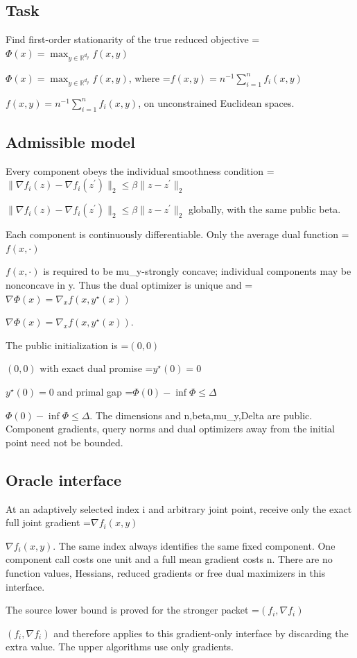 \documentclass[10pt,a4paper]{article}
\newcommand{\AtlasMath}[1]{\par\begingroup\centering\setbox0=\hbox{$\displaystyle #1$}\ifdim\wd0>1.4\linewidth\typeout{ATLAS WIDE FORMULA: \the\wd0}\fi\ifdim\wd0>\linewidth\resizebox{\linewidth}{!}{\box0}\else\box0\fi\par\endgroup}
\newcommand{\AtlasInlineMath}[1]{\begingroup\setbox0=\hbox{$#1$}\ifdim\wd0>.4\linewidth\endgroup\AtlasMath{#1}\else\endgroup$#1$\fi}
\begin{document}
\subsection{Task}


Find first-order stationarity of the true reduced objective \AtlasInlineMath{\Phi(x)=\max_{y\in\mathbb R^{d_y}} f(x,y)}, where \AtlasInlineMath{f(x,y)=n^{-1}\sum_{i=1}^n f_i(x,y)}, on unconstrained Euclidean spaces.



\subsection{Admissible model}


Every component obeys the individual smoothness condition \AtlasInlineMath{\|\nabla f_i(z)-\nabla f_i(z^\prime)\|_2\le\beta\|z-z^\prime\|_2} globally, with the same public beta.



Each component is continuously differentiable. Only the average dual function \AtlasInlineMath{f(x,\cdot)} is required to be mu\_y-strongly concave; individual components may be nonconcave in y. Thus the dual optimizer is unique and \AtlasInlineMath{\nabla\Phi(x)=\nabla_x f(x,y^\star(x))}.



The public initialization is \AtlasInlineMath{(0,0)} with exact dual promise \AtlasInlineMath{y^\star(0)=0} and primal gap \AtlasInlineMath{\Phi(0)-\inf\Phi\le\Delta}. The dimensions and n,beta,mu\_y,Delta are public. Component gradients, query norms and dual optimizers away from the initial point need not be bounded.



\subsection{Oracle interface}


At an adaptively selected index i and arbitrary joint point, receive only the exact full joint gradient \AtlasInlineMath{\nabla f_i(x,y)}. The same index always identifies the same fixed component. One component call costs one unit and a full mean gradient costs n. There are no function values, Hessians, reduced gradients or free dual maximizers in this interface.



The source lower bound is proved for the stronger packet \AtlasInlineMath{(f_i,\nabla f_i)} and therefore applies to this gradient-only interface by discarding the extra value. The upper algorithms use only gradients.
\end{document}
